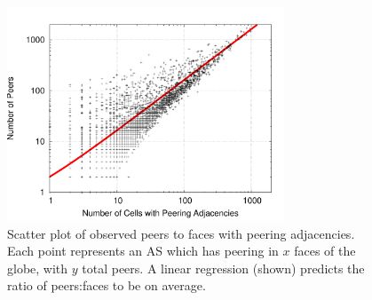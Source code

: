 
    \begin{figure}[tb]
\centering
\includegraphics[width=3.25in]{scatter}
\caption[]{\label{fig:scatter} Scatter plot of observed peers to faces with peering adjacencies. Each point represents an AS which has peering in $x$ faces of the globe, with $y$ total peers. A linear regression (shown) predicts the ratio of peers:faces to be  on average. } 
\end{figure}

